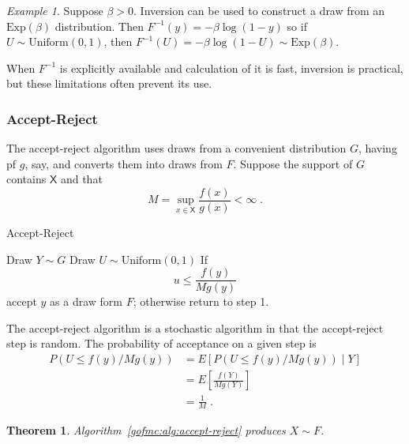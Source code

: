 \documentclass[12pt]{article}
\theoremstyle{plain}
\newtheorem{thm}{Theorem}[section]
\theoremstyle{definition}
\theoremstyle{remark}
\newtheorem{example}{Example}[section]
\newcommand{\sX}{\mathsf{X}}
\begin{document}
\begin{example}
  Suppose $\beta > 0$.  Inversion can be used to construct a draw from
  an $\text{Exp}(\beta)$ distribution.  Then $F^{-1}(y) = -\beta
  \log(1-y)$ so if $U \sim \text{Uniform}(0,1)$, then $F^{-1}(U) =
  -\beta \log(1-U) \sim \text{Exp}(\beta)$.
\end{example}

When $F^{-1}$ is explicitly available and calculation of it is fast,
inversion is practical, but these limitations often prevent its use.

\subsubsection{Accept-Reject}
The accept-reject algorithm uses draws from a convenient distribution
$G$, having pf $g$, say, and converts them into draws from $F$.
Suppose the support of $G$ contains $\sX$ and that
\[
M = \sup_{x \in \sX} \frac{f(x)}{g(x)}< \infty \; .
\]

\begin{algorithm}[H]
 \caption{Accept-Reject} \label{gofmc:alg:accept-reject}
 \begin{algorithmic}[1]
 \State Draw $Y \sim G$
 \State Draw $U \sim \text{Uniform}(0,1)$
 \State If
 \[
u \le \frac{f(y)}{M g(y)}
 \]
accept $y$ as a draw form $F$; otherwise return to step 1.   
 \end{algorithmic}
\end{algorithm}

The accept-reject algorithm is a stochastic algorithm in that
the accept-reject step is random.  The probability of acceptance on a 
given step is
\begin{align*}
P( U \le f(y) / M g(y)) & = E \left[P( U \le f(y) / M g(y)) \mid  Y \right]\\
& = E \left[ \frac{f(Y)}{Mg(Y)} \right]\\
& = \frac{1}{M} \; .
\end{align*}

\begin{thm} \label{gofmc:thm:accept-reject}
Algorithm~\ref{gofmc:alg:accept-reject} produces $X \sim F$.
\end{thm}
\end{document}
